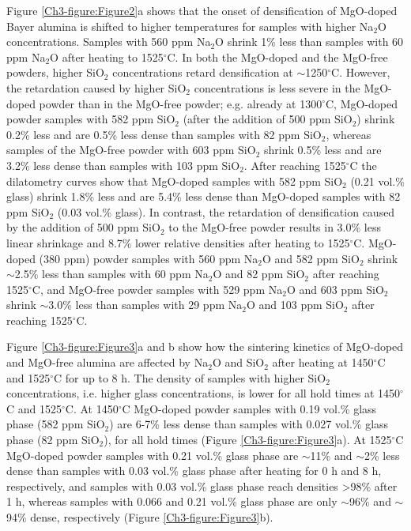 Figure \ref{Ch3-figure:Figure2}a shows that the onset of densification of MgO-doped Bayer alumina is shifted to higher temperatures for samples with higher Na$_{2}$O concentrations. Samples with 560 ppm Na$_{2}$O shrink 1\% less than samples with 60 ppm Na$_{2}$O after heating to 1525$^{\circ}$C. In both the MgO-doped and the MgO-free powders, higher SiO$_{2}$ concentrations retard densification at $\sim$1250$^{\circ}$C. However, the retardation caused by higher SiO$_{2}$ concentrations is less severe in the MgO-doped powder than in the MgO-free powder; e.g. already at 1300$^{\circ}$C, MgO-doped powder samples with 582 ppm SiO$_{2}$ (after the addition of 500 ppm SiO$_{2}$) shrink 0.2\% less and are 0.5\% less dense than samples with 82 ppm SiO$_{2}$, whereas samples of the MgO-free powder with 603 ppm SiO$_{2}$ shrink 0.5\% less and are 3.2\% less dense than samples with 103 ppm SiO$_{2}$. After reaching 1525$^{\circ}$C the dilatometry curves show that MgO-doped samples with 582 ppm SiO$_{2}$ (0.21 vol.\% glass) shrink 1.8\% less and are 5.4\% less dense than MgO-doped samples with 82 ppm SiO$_{2}$ (0.03 vol.\% glass). In contrast, the retardation of densification caused by the addition of 500 ppm SiO$_{2}$ to the MgO-free powder results in 3.0\% less linear shrinkage and 8.7\% lower relative densities after heating to 1525$^{\circ}$C. MgO-doped (380 ppm) powder samples with 560 ppm Na$_{2}$O and 582 ppm SiO$_{2}$ shrink $\sim$2.5\% less than samples with 60 ppm Na$_{2}$O and 82 ppm SiO$_{2}$ after reaching 1525$^{\circ}$C, and MgO-free powder samples with 529 ppm Na$_{2}$O and 603 ppm SiO$_{2}$ shrink $\sim$3.0\% less than samples with 29 ppm Na$_{2}$O and 103 ppm SiO$_{2}$ after reaching 1525$^{\circ}$C.

Figure \ref{Ch3-figure:Figure3}a and b show how the sintering kinetics of MgO-doped and MgO-free alumina are affected by Na$_{2}$O and SiO$_{2}$ after heating at 1450$^{\circ}$C and 1525$^{\circ}$C for up to 8 h. The density of samples with higher SiO$_{2}$ concentrations, i.e. higher glass concentrations, is lower for all hold times at 1450$^{\circ}$C and 1525$^{\circ}$C. At 1450$^{\circ}$C MgO-doped powder samples with 0.19 vol.\% glass phase (582 ppm SiO$_{2}$) are 6-7\% less dense than samples with 0.027 vol.\% glass phase (82 ppm SiO$_{2}$), for all hold times (Figure \ref{Ch3-figure:Figure3}a). At 1525$^{\circ}$C MgO-doped powder samples with 0.21 vol.\% glass phase are $\sim$11\% and $\sim$2\% less dense than samples with 0.03 vol.\% glass phase after heating for 0 h and 8 h, respectively, and samples with 0.03 vol.\% glass phase reach densities >98\% after 1 h, whereas samples with 0.066 and 0.21 vol.\% glass phase are only $\sim$96\% and $\sim$94\% dense, respectively (Figure \ref{Ch3-figure:Figure3}b). 

